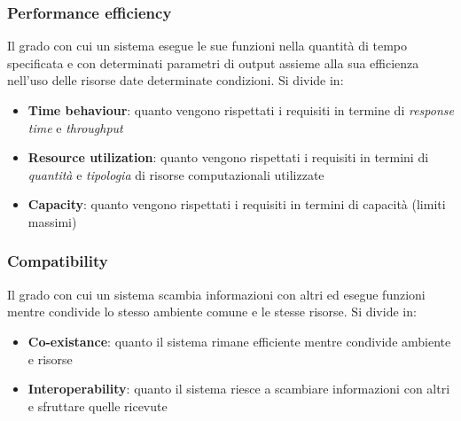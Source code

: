 \subsubsection{Performance efficiency}
Il grado con cui un sistema esegue le sue funzioni nella quantità di tempo specificata e con determinati parametri di output assieme alla sua efficienza nell'uso delle risorse date determinate condizioni. Si divide in:
\begin{itemize}
	\item \textbf{Time behaviour}: quanto vengono rispettati i requisiti in termine di \textit{response time} e \textit{throughput}
	\item \textbf{Resource utilization}: quanto vengono rispettati i requisiti  in termini di \textit{quantità} e \textit{tipologia} di risorse computazionali utilizzate
	\item \textbf{Capacity}: quanto vengono rispettati i requisiti in termini di capacità (limiti massimi)
\end{itemize}

\subsubsection{Compatibility}
Il grado con cui un sistema scambia informazioni con altri ed esegue funzioni mentre condivide lo stesso ambiente comune e le stesse risorse. Si divide in:
\begin{itemize}
	\item \textbf{Co-existance}: quanto il sistema rimane efficiente mentre condivide ambiente e risorse
	\item \textbf{Interoperability}: quanto il sistema riesce a scambiare informazioni con altri e sfruttare quelle ricevute
\end{itemize}

